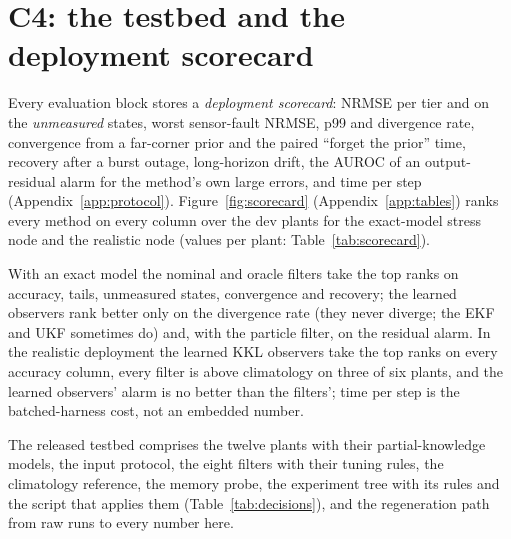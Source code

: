 \section{C4: the testbed and the deployment scorecard}\label{sec:scorecard}

Every evaluation block stores a \emph{deployment scorecard}: NRMSE per tier and on the \emph{unmeasured} states, worst sensor-fault NRMSE, p99 and divergence rate, convergence from a far-corner prior and the paired ``forget the prior'' time, recovery after a burst outage, long-horizon drift, the AUROC of an output-residual alarm for the method's own large errors, and time per step (Appendix~\ref{app:protocol}). Figure~\ref{fig:scorecard} (Appendix~\ref{app:tables}) ranks every method on every column over the dev plants for the exact-model stress node and the realistic node (values per plant: Table~\ref{tab:scorecard}).

With an exact model the nominal and oracle filters take the top ranks on accuracy, tails, unmeasured states, convergence and recovery; the learned observers rank better only on the divergence rate (they never diverge; the EKF and UKF sometimes do) and, with the particle filter, on the residual alarm. In the realistic deployment the learned KKL observers take the top ranks on every accuracy column, every filter is above climatology on three of six plants, and the learned observers' alarm is no better than the filters'; time per step is the batched-harness cost, not an embedded number.

The released testbed comprises the twelve plants with their partial-knowledge models, the input protocol, the eight filters with their tuning rules, the climatology reference, the memory probe, the experiment tree with its rules and the script that applies them (Table~\ref{tab:decisions}), and the regeneration path from raw runs to every number here.
